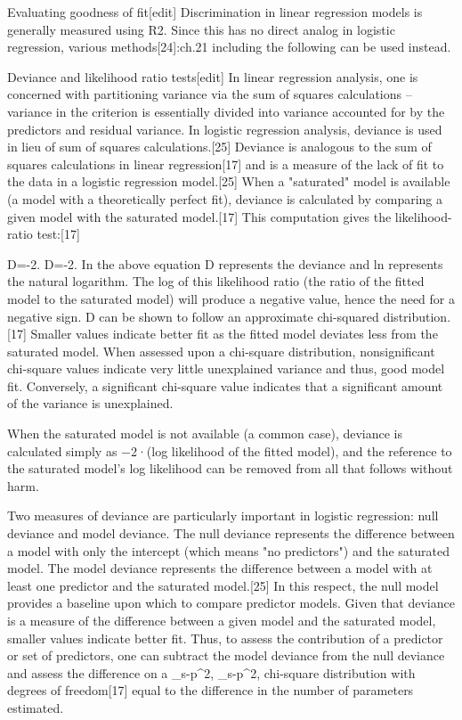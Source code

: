 Evaluating goodness of fit[edit]
Discrimination in linear regression models is generally measured using R2. Since this has no direct analog in logistic regression, various methods[24]:ch.21 including the following can be used instead.

Deviance and likelihood ratio tests[edit]
In linear regression analysis, one is concerned with partitioning variance via the sum of squares calculations – variance in the criterion is essentially divided into variance accounted for by the predictors and residual variance. In logistic regression analysis, deviance is used in lieu of sum of squares calculations.[25] Deviance is analogous to the sum of squares calculations in linear regression[17] and is a measure of the lack of fit to the data in a logistic regression model.[25] When a "saturated" model is available (a model with a theoretically perfect fit), deviance is calculated by comparing a given model with the saturated model.[17] This computation gives the likelihood-ratio test:[17]

{\displaystyle D=-2.} D=-2.
In the above equation D represents the deviance and ln represents the natural logarithm. The log of this likelihood ratio (the ratio of the fitted model to the saturated model) will produce a negative value, hence the need for a negative sign. D can be shown to follow an approximate chi-squared distribution.[17] Smaller values indicate better fit as the fitted model deviates less from the saturated model. When assessed upon a chi-square distribution, nonsignificant chi-square values indicate very little unexplained variance and thus, good model fit. Conversely, a significant chi-square value indicates that a significant amount of the variance is unexplained.

When the saturated model is not available (a common case), deviance is calculated simply as −2·(log likelihood of the fitted model), and the reference to the saturated model's log likelihood can be removed from all that follows without harm.

Two measures of deviance are particularly important in logistic regression: null deviance and model deviance. The null deviance represents the difference between a model with only the intercept (which means "no predictors") and the saturated model. The model deviance represents the difference between a model with at least one predictor and the saturated model.[25] In this respect, the null model provides a baseline upon which to compare predictor models. Given that deviance is a measure of the difference between a given model and the saturated model, smaller values indicate better fit. Thus, to assess the contribution of a predictor or set of predictors, one can subtract the model deviance from the null deviance and assess the difference on a {\displaystyle \chi _{s-p}^{2},} \chi _{s-p}^{2}, chi-square distribution with degrees of freedom[17] equal to the difference in the number of parameters estimated.

